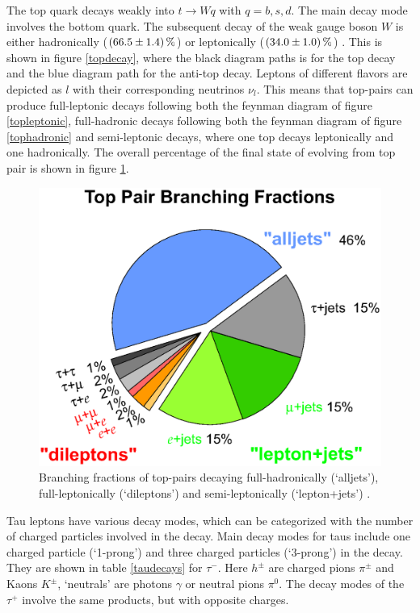 %
The top quark decays weakly into $t\rightarrow Wq$ with $q=b,s,d$. The main decay mode involves the bottom quark. The subsequent decay of the weak gauge boson $W$ is either hadronically ($\SI{66.5\pm 1.4}{\percent}$) or leptonically ($\SI{34\pm1.0}{\percent}$) \cite{PhysRevD}. This is shown in figure \ref{topdecay}, where the black diagram paths is for the top decay and the blue diagram path for the anti-top decay. Leptons of different flavors are depicted as $l$ with their corresponding neutrinos $\nu_l$. This means that top-pairs can produce full-leptonic decays following both the feynman diagram of figure \ref{topleptonic}, full-hadronic decays following both the feynman diagram of figure \ref{tophadronic} and semi-leptonic decays, where one top decays leptonically and one hadronically. The overall percentage of the final state of evolving from top pair is shown in figure \ref{topcake}.\newline
%
\begin{figure}[htbp]                                 
 \begin{center}                                       
  \includegraphics[width=0.6\linewidth]{figures/top_pair_branching_frac.eps} 
   \caption[Branching fractions of top-pairs.]{Branching fractions of top-pairs decaying full-hadronically (`alljets'), full-leptonically (`dileptons') and semi-leptonically (`lepton+jets') \cite{D0}. }
  \label{topcake}                                     
 \end{center}
\end{figure}
%
Tau leptons have various decay modes, which can be categorized with the number of charged particles involved in the decay. Main decay modes for taus include one charged particle (`1-prong') and three charged particles (`3-prong') in the decay. They are shown in table \ref{taudecays} for $\tau^-$. Here $h^{\pm}$ are charged pions $\pi^\pm$ and Kaons $K^\pm$, `neutrals' are photons $\gamma$ or neutral pions $\pi^0$. The decay modes of the $\tau^+$ involve the same products, but with opposite charges.\par
